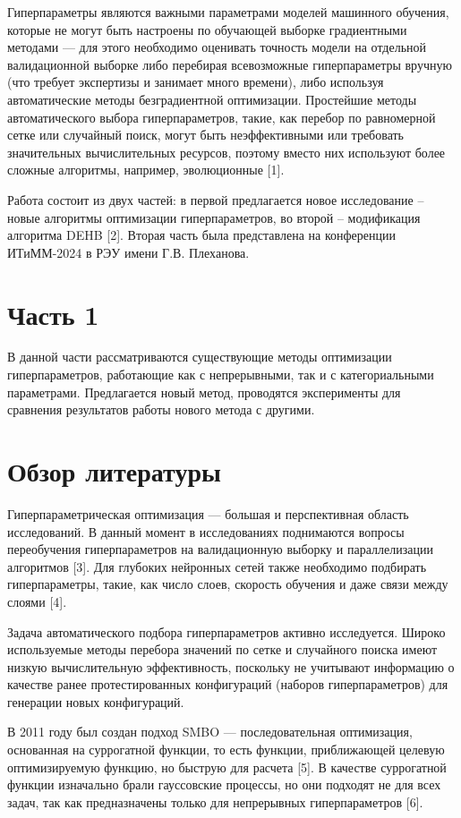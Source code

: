 \documentclass[a4paper,12pt]{article}
\begin{document}
Гиперпараметры являются важными параметрами моделей машинного 
обучения, которые не могут быть настроены по обучающей выборке 
градиентными методами — для этого необходимо оценивать точность модели 
на отдельной валидационной выборке либо перебирая всевозможные 
гиперпараметры вручную (что требует экспертизы и занимает много времени), 
либо используя автоматические методы безградиентной оптимизации. 
Простейшие методы автоматического выбора гиперпараметров, такие, как 
перебор по равномерной сетке или случайный поиск, могут быть 
неэффективными или требовать значительных вычислительных ресурсов, 
поэтому вместо них используют более сложные алгоритмы, например, 
эволюционные [1].

Работа состоит из двух частей: в первой предлагается новое исследование -- новые алгоритмы оптимизации гиперпараметров, во второй -- модификация алгоритма DEHB [2]. Вторая часть была представлена на конференции ИТиММ-2024 в РЭУ имени Г.В. Плеханова.

\section{Часть 1}
В данной части рассматриваются существующие методы оптимизации гиперпараметров, работающие как с непрерывными, так и с категориальными параметрами. Предлагается новый метод, проводятся эксперименты для сравнения результатов работы нового метода с другими.

\section{Обзор литературы}

Гиперпараметрическая оптимизация — большая и перспективная область исследований. В данный момент в исследованиях поднимаются вопросы переобучения гиперпараметров на валидационную выборку и параллелизации алгоритмов [3]. Для глубоких нейронных сетей также необходимо подбирать гиперпараметры, такие, как число слоев, скорость обучения и даже связи между слоями [4].

Задача автоматического подбора гиперпараметров активно исследуется. Широко используемые методы перебора значений по сетке и случайного поиска имеют низкую вычислительную эффективность, поскольку не учитывают информацию о качестве ранее протестированных конфигураций (наборов гиперпараметров) для генерации новых конфигураций. 

В 2011 году был создан подход SMBO — последовательная оптимизация, основанная на суррогатной функции, то есть функции, приближающей целевую оптимизируемую функцию, но быструю для расчета [5]. В качестве суррогатной функции изначально брали гауссовские процессы, но они подходят не для всех задач, так как предназначены только для непрерывных гиперпараметров [6]. 
\end{document}
